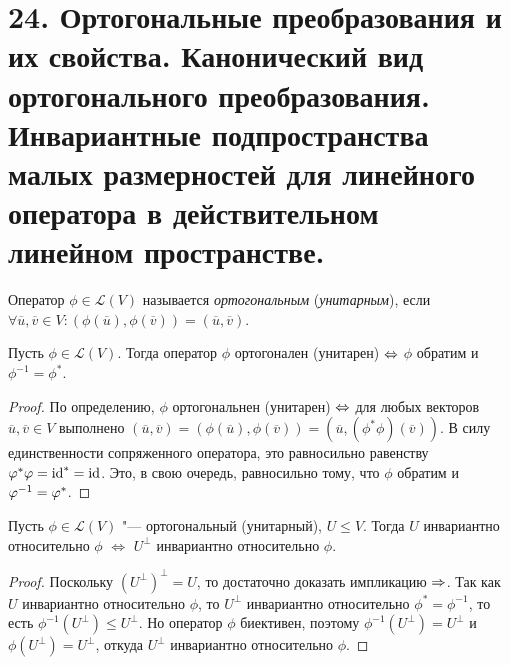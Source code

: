 \section{24. Ортогональные преобразования и их свойства. Канонический вид ортогонального преобразования. Инвариантные подпространства малых размерностей для линейного оператора в действительном линейном пространстве.}

\begin{definition}
	Оператор $\phi \in \mathcal{L}(V)$ называется \textit{ортогональным} (\textit{унитарным}), если $\forall \overline{u}, \overline{v} \in V: (\phi(\overline{u}), \phi(\overline{v})) = (\overline{u}, \overline{v})$.
\end{definition}

\begin{theorem}
	Пусть $\phi \in \mathcal{L}(V)$. Тогда оператор $\phi$ ортогонален (унитарен) $\hm\Leftrightarrow$ $\phi$ обратим и $\phi^{-1} = \phi^{*}$.
\end{theorem}

\begin{proof}
	По определению, $\phi$ ортогональнен (унитарен) $\hm{\Leftrightarrow}$ для любых векторов $\overline{u}, \overline{v} \in V$ выполнено $(\overline{u}, \overline{v}) = (\phi(\overline{u}), \phi(\overline{v})) = (\overline{u}, (\phi^*\phi)(\overline{v}))$. В силу единственности сопряженного оператора, это равносильно равенству $\varphi^*\varphi = \mathrm{id}^* = \mathrm{id}$. Это, в свою очередь, равносильно тому, что $\phi$ обратим и $\phi^{-1} \hm{=} \phi^{*}$.
\end{proof}

\begin{proposition}
	Пусть $\phi\in \mathcal{L}(V)$ "--- ортогональный (унитарный), $U \le V$. Тогда $U$ инвариантно относительно $\phi$ $\Leftrightarrow$ $U^\perp$ инвариантно относительно $\phi$.
\end{proposition}

\begin{proof}
	Поскольку $(U^\perp)^\perp = U$, то достаточно доказать импликацию $\Rightarrow$. Так как $U$ инвариантно относительно $\phi$, то $U^\perp$ инвариантно относительно $\phi^* = \phi^{-1}$, то есть $\phi^{-1}(U^\perp) \le U^\perp$. Но оператор $\phi$ биективен, поэтому $\phi^{-1}(U^\perp) = U^\perp$ и $\phi(U^\perp) = U^\perp$, откуда $U^\perp$ инвариантно относительно $\phi$.
\end{proof}

